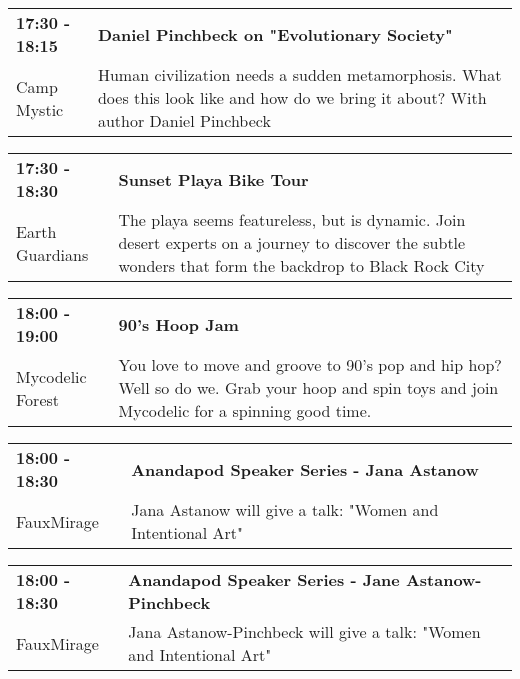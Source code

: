 \begin{tabular}{ p{1in} p{2.2in} }
    \textbf{17:30 - 18:15} & \textbf{Daniel Pinchbeck on "Evolutionary Society"} \\
    Camp Mystic \newline  & Human civilization needs a sudden metamorphosis. What does this look like and how do we bring it about? With author Daniel Pinchbeck \\
    \hline 
\end{tabular}
    
\begin{tabular}{ p{1in} p{2.2in} }
    \textbf{17:30 - 18:30} & \textbf{Sunset Playa Bike Tour } \\
    Earth Guardians \newline  & The playa seems featureless, but is dynamic. Join desert experts on a journey to discover the subtle wonders that form the backdrop to Black Rock City \\
    \hline 
\end{tabular}
    
\begin{tabular}{ p{1in} p{2.2in} }
    \textbf{18:00 - 19:00} & \textbf{90's Hoop Jam} \\
    Mycodelic Forest \newline  & You love to move and groove to 90's pop and hip hop? Well so do we. Grab your hoop and spin toys and join Mycodelic for a spinning good time. \\
    \hline 
\end{tabular}
    
\begin{tabular}{ p{1in} p{2.2in} }
    \textbf{18:00 - 18:30} & \textbf{Anandapod Speaker Series - Jana Astanow} \\
    FauxMirage \newline  & Jana Astanow will give a talk: "Women and Intentional Art" \\
    \hline 
\end{tabular}
    
\begin{tabular}{ p{1in} p{2.2in} }
    \textbf{18:00 - 18:30} & \textbf{Anandapod Speaker Series - Jane Astanow-Pinchbeck} \\
    FauxMirage \newline  & Jana Astanow-Pinchbeck will give a talk: "Women and Intentional Art" \\
    \hline 
\end{tabular}
    
